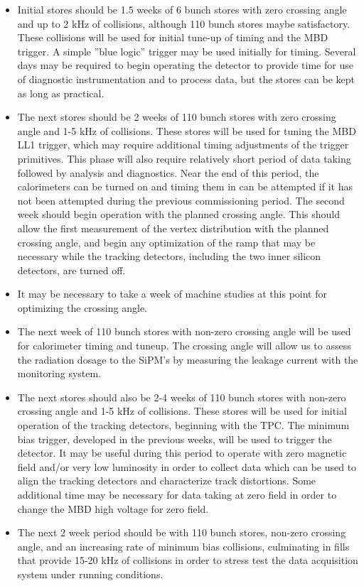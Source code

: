 \begin{itemize}

\item Initial stores should be 1.5 weeks of 6 bunch stores with zero crossing
angle and up to 2 kHz of collisions, although 110 bunch stores maybe satisfactory.  
These collisions will be used for initial tune-up of timing and the MBD trigger.  
A simple ''blue logic'' trigger may be used initially for timing.
Several days may be required to begin operating the detector to provide time
for use of diagnostic instrumentation and to process data, but the stores can
be kept as long as practical.

\item The next stores should be 2 weeks of 110 bunch stores with zero crossing angle
and 1-5 kHz of collisions.  These stores will be used for tuning the MBD LL1
trigger, which may require additional timing adjustments of the trigger primitives.
This phase will also require relatively short period of data taking followed by analysis
and diagnostics.
Near the end of this period, the calorimeters can be turned on and timing them in can be
attempted if it has not been attempted during the previous commissioning period.
The second week should begin operation with the planned crossing angle.  
This should allow the first measurement of the vertex distribution with the
planned crossing angle, and begin any optimization of the ramp that may be necessary
while the tracking detectors, including the two inner silicon detectors,
are turned off.

\item It may be necessary to take a week of machine studies at this point for 
optimizing the crossing angle.

\item The next week of 110 bunch stores with non-zero crossing angle will be used for calorimeter
timing and tuneup.
The crossing angle will allow us to assess the radiation dosage to the SiPM's
by measuring the leakage current with the monitoring system.

\item The next stores should also be 2-4 weeks of 110 bunch stores with non-zero crossing angle
and 1-5 kHz of collisions.  
These stores will be used for initial operation of the tracking detectors, beginning with the
TPC.  
The minimum bias trigger, developed in the previous weeks, will be used to trigger the
detector.  
It may be useful during this period to operate with zero magnetic field and/or very
low luminosity in order to collect data which can be used to align the tracking
detectors and characterize track distortions.
Some additional time may be necessary for data taking at zero field in order to
change the MBD  high voltage for zero field.

\item The next 2 week period should be with 110 bunch stores, non-zero crossing
angle, and an increasing rate of minimum bias collisions, culminating in fills that
provide 15-20 kHz of collisions in order to stress test the data acquisition system
under running conditions.  

\end{itemize}

